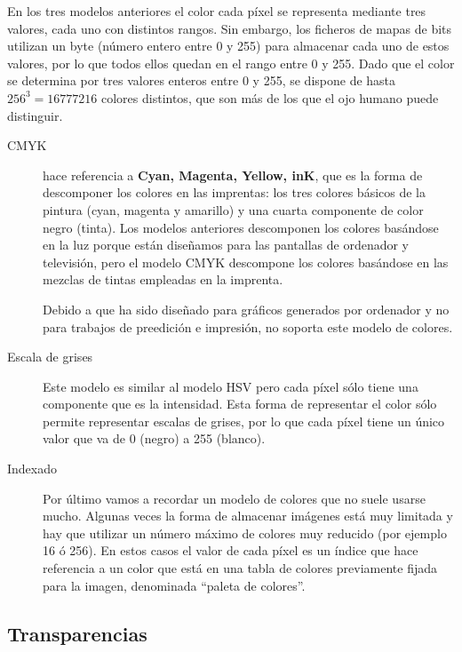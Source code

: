 En los  tres  modelos anteriores el color cada píxel se representa mediante
tres valores, cada uno con distintos rangos. Sin embargo, los ficheros de mapas
de bits utilizan un byte (número entero entre 0 y 255) para almacenar cada uno
de estos valores, por lo que todos ellos quedan en el rango entre 0 y 255.
Dado que el color se determina por tres valores enteros entre 0 y 255, se
dispone de hasta $256^3 = 16777216$ colores distintos, que son más de los
que el ojo humano puede distinguir.

\begin{description}

\item[CMYK] hace referencia a {\bf Cyan, Magenta, Yellow, inK}, que es
la  forma de  descomponer los  colores en  las imprentas: los tres colores
básicos de la pintura (cyan, magenta y amarillo) y una cuarta componente
de color negro (tinta). Los modelos anteriores descomponen los colores
basándose  en la luz  porque están diseñamos para las pantallas de ordenador y
televisión, pero el modelo CMYK descompone los colores basándose en las
mezclas de tintas empleadas en la imprenta.

Debido a que \gimp ha sido diseñado para gráficos generados por ordenador
y no para trabajos  de preedición  e impresión, no  soporta este  modelo de
colores.

\item[Escala de grises]  Este modelo es similar  al modelo HSV
pero cada píxel  sólo tiene una componente que es  la intensidad. Esta
forma  de representar  el color  sólo permite  representar escalas  de
grises, por lo que cada píxel tiene un único valor que va de 0 (negro)
a 255 (blanco).

\item[Indexado] Por último  vamos a recordar un modelo  de colores que
no suele  usarse mucho. Algunas  veces la forma de  almacenar imágenes
está muy limitada  y hay que utilizar un número  máximo de colores muy
reducido (por ejemplo 16 ó 256). En estos casos el valor de  cada píxel
es un índice que  hace referencia a  un color que  está en una  tabla de
colores  previamente fijada  para  la  imagen, denominada ``paleta de colores''.

\end{description}

\subsection{Transparencias}

